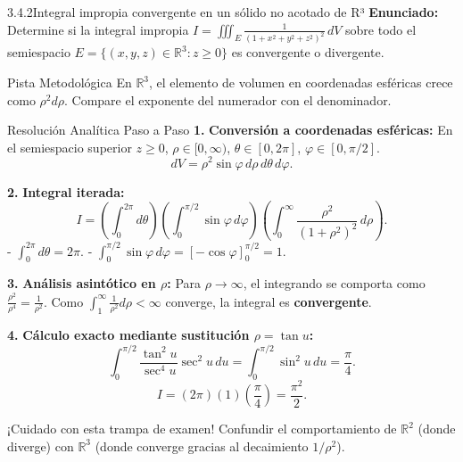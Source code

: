 \documentclass[11pt,a4paper]{article}
\begin{document}
\begin{nivelbox}{3.4.2}{Integral impropia convergente en un sólido no acotado de R³}
\textbf{Enunciado:}\\
Determine si la integral impropia $I = \iiint_E \frac{1}{(1 + x^2 + y^2 + z^2)^2} \, dV$ sobre todo el semiespacio $E = \{ (x,y,z) \in \mathbb{R}^3 : z \ge 0 \}$ es convergente o divergente.

\begin{observacionbox}{Pista Metodológica}
En $\mathbb{R}^3$, el elemento de volumen en coordenadas esféricas crece como $\rho^2 d\rho$. Compare el exponente del numerador con el denominador.
\end{observacionbox}

\begin{ejerciciobox}{Resolución Analítica Paso a Paso}
\smallskip\noindent\textbf{1.} \textbf{Conversión a coordenadas esféricas:}
En el semiespacio superior $z \ge 0$, $\rho \in [0, \infty)$, $\theta \in [0, 2\pi]$, $\varphi \in [0, \pi/2]$.
\[dV = \rho^2 \sin\varphi \, d\rho \, d\theta \, d\varphi.\]

\smallskip\noindent\textbf{2.} \textbf{Integral iterada:}
\[I = \left( \int_0^{2\pi} d\theta \right) \left( \int_0^{\pi/2} \sin\varphi \, d\varphi \right) \left( \int_0^\infty \frac{\rho^2}{(1 + \rho^2)^2} \, d\rho \right).\]
- $\int_0^{2\pi} d\theta = 2\pi$.
- $\int_0^{\pi/2} \sin\varphi \, d\varphi = [-\cos\varphi]_0^{\pi/2} = 1$.

\smallskip\noindent\textbf{3.} \textbf{Análisis asintótico en $\rho$:}
Para $\rho \to \infty$, el integrando se comporta como $\frac{\rho^2}{\rho^4} = \frac{1}{\rho^2}$.
Como $\int_1^\infty \frac{1}{\rho^2} d\rho < \infty$ converge, la integral es \textbf{convergente}.

\smallskip\noindent\textbf{4.} \textbf{Cálculo exacto mediante sustitución $\rho = \tan u$:}
\[\int_0^{\pi/2} \frac{\tan^2 u}{\sec^4 u} \sec^2 u \, du = \int_0^{\pi/2} \sin^2 u \, du = \frac{\pi}{4}.\]
\[I = (2\pi)(1)\left(\frac{\pi}{4}\right) = \frac{\pi^2}{2}.\]
\end{ejerciciobox}

\begin{errorbox}{¡Cuidado con esta trampa de examen!}
Confundir el comportamiento de $\mathbb{R}^2$ (donde diverge) con $\mathbb{R}^3$ (donde converge gracias al decaimiento $1/\rho^2$).
\end{errorbox}
\end{nivelbox}
\bigskip
\end{document}
